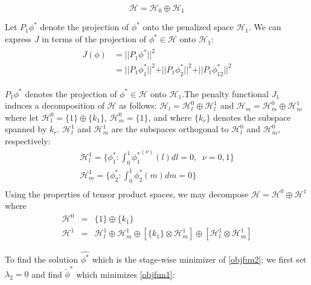 \documentclass[12pt]{article}
\theoremstyle{definition}
\begin{document}
\[
\mathcal{H} = \mathcal{H}_0 \oplus \mathcal{H}_1
\]
\noindent

Let $P_1 \phi^*$  denote the projection of $\phi^*$ onto the penalized space $\mathcal{H}_1$. We can express $J$ in terms of the projection of $\phi^* \in \mathcal{H}$ onto $\mathcal{H}_1$:
\begin{align}
\begin{split} 
J\left(\phi\right) &= \vert \vert P_1 \phi^* \vert \vert^2\\
&= \vert \vert {P_1 \phi_1^*} \vert \vert^2 + \vert \vert {P_1 \phi_2^*} \vert \vert^2 + \vert \vert {P_1 \phi_{12}^*} \vert \vert^2  \label{eq:SS_penalty}
\end{split}
\end{align} 
\noindent

$P_1 \phi^*$ denotes the projection of $\phi^* \in \mathcal{H}$ onto $\mathcal{H}_1$.The penalty functional $J_1$ induces a decomposition of $\mathcal{H}$ as follows: $\mathcal{H}_l = \mathcal{H}_l^0 \oplus \mathcal{H}_l^1$ and $\mathcal{H}_m = \mathcal{H}_m^0 \oplus \mathcal{H}_m^1$ where let $\mathcal{H}_l^0 =  \lbrace 1 \rbrace \oplus \lbrace k_1 \rbrace$, $\mathcal{H}_m^0 =  \lbrace  1 \rbrace$, and where $\lbrace k_r \rbrace$ denotes the subspace spanned by $k_r$. $\mathcal{H}_l^1$ and $\mathcal{H}_m^1$ are the subspaces orthogonal to $\mathcal{H}_l^0$ and $\mathcal{H}_m^0$, respectively:
\begin{eqnarray*}
\mathcal{H}_l^1 = \lbrace \phi^*_1: \int_0^1 {\phi_1^*}^{\left( \nu \right)}\left(l\right) dl = 0,\;\; \nu = 0,1\rbrace\\
\mathcal{H}_m^1 = \lbrace \phi^*_2: \int_0^1 \phi_2^* \left(m\right) dm = 0 \rbrace\\
\end{eqnarray*}
\noindent
Using the properties of tensor product spaces, we may decompose $\mathcal{H} = \mathcal{H}^0\oplus \mathcal{H}^1$ where
\begin{eqnarray*}
\mathcal{H}^0 &=& \lbrace 1 \rbrace \oplus \lbrace k_1 \rbrace\\
\mathcal{H}^1 &=& \mathcal{H}_l^1 \oplus \mathcal{H}_m^1 \oplus  \left[ \lbrace k_1 \rbrace  \otimes  \mathcal{H}_m^1 \right]  \oplus  \left[\mathcal{H}_l^1 \otimes  \mathcal{H}_m^1\right]   
\end{eqnarray*}

 To find the solution $\hat{\phi^*}$ which is the stage-wise minimizer of \eqref{objfun2}: we first set $\lambda_2 = 0$ and find $\tilde{\phi}^*$ which minimizes \eqref{objfun1}:
\end{document}
